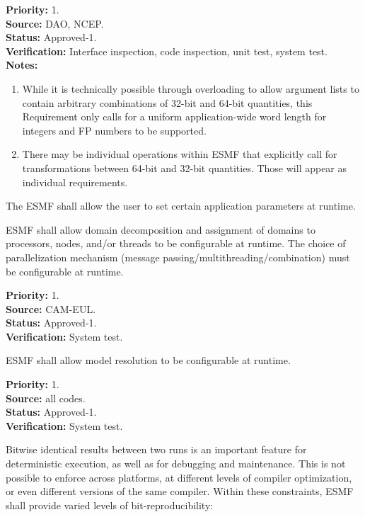 \begin{reqlist}
  {\bf Priority:} 1. \\
  {\bf Source:} DAO, NCEP. \\
  {\bf Status:} Approved-1. \\
  {\bf Verification:} Interface inspection, code inspection, unit
  test, system test. \\
  {\bf Notes:}
  \begin{enumerate}
  \item While it is technically possible through overloading to allow
    argument lists to contain arbitrary combinations of 32-bit and
    64-bit quantities, this Requirement only calls for a uniform
    application-wide word length for integers and FP numbers to be
    supported.
  \item There may be individual operations within ESMF that explicitly
    call for transformations between 64-bit and 32-bit quantities.
    Those will appear as individual requirements.
  \end{enumerate}
\end{reqlist}

 The ESMF shall allow the user to set
certain application parameters at runtime.

 ESMF shall allow domain
decomposition and assignment of domains to processors, nodes, and/or
threads to be configurable at runtime.  The choice of parallelization
mechanism (message passing/multithreading/combination) must be
configurable at runtime.
\begin{reqlist}
{\bf Priority:} 1. \\
{\bf Source:} CAM-EUL. \\
{\bf Status:} Approved-1. \\
{\bf Verification:} System test.
\end{reqlist}

ESMF shall allow model resolution to be configurable at runtime.
\begin{reqlist}
{\bf Priority:} 1. \\
{\bf Source:} all codes. \\
{\bf Status:} Approved-1. \\
{\bf Verification:} System test.
\end{reqlist}


Bitwise identical results between two runs is an important feature for
deterministic execution, as well as for debugging and maintenance.
This is not possible to enforce across platforms, at different levels
of compiler optimization, or even different versions of the same
compiler. Within these constraints, ESMF shall provide varied levels
of bit-reproducibility:

